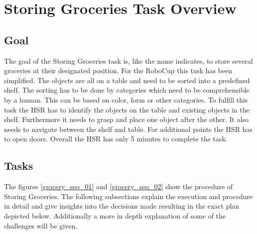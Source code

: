 \documentclass[main.tex]{subfiles}
\begin{document}
	
	\begingroup
	
	\renewcommand{\cleardoublepage}{}
	
	\renewcommand{\clearpage}{}
	
	\chapter{Storing Groceries Task Overview}
	

	\section{Goal}
	The goal of the Storing Groceries task is, like the name indicates, to store several groceries at their designated position. For the RoboCup this task has been simplified. The objects are all on a table and need to be sorted into a predefined shelf. The sorting has to be done by categories which need to be comprehensible by a human. This can be based on color, form or other categories. To fulfill this task the HSR has to identify the objects on the table and existing objects in the shelf. Furthermore it needs to grasp and place one object after the other. It also needs to navigate between the shelf and table. For additional points the HSR has to open doors. Overall the HSR has only 5 minutes to complete the task. 

	\section{Tasks}
	The figures \ref{grocery_seq_01} and \ref{grocery_seq_02} show the procedure of Storing Groceries. The following subsections explain the execution and procedure in detail and give insights into the decisions made resulting in the exact plan depicted below. Additionally a more in depth explanation of some of the challenges will be given.
	
\end{document}
